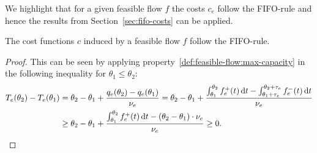 We highlight that for a given feasible flow $f$ the costs $c_e$ follow the FIFO-rule and hence the results from Section~\ref{sec:fifo-costs} can be applied.
\begin{proposition}
    The cost functions $c$ induced by a feasible flow $f$ follow the FIFO-rule.
\end{proposition}
\begin{proof}
    This can be seen by applying property~\ref{def:feasible-flow:max-capacity} in the following inequality for $\theta_1\leq \theta_2$:
    \begin{align*}
        T_e(\theta_2) - T_e(\theta_1)
        &= \theta_2 - \theta_1 + \frac{q_e(\theta_2) - q_e(\theta_1)}{\nu_e}
        = \theta_2 - \theta_1 + \frac{\int_{\theta_1}^{\theta_2}f_e^+(t)\,\textnormal{d} t - \int_{\theta_1 + \tau_e}^{\theta_2 + \tau_e} f_e^-(t) \,\textnormal{d} t}{\nu_e}\\
        &\geq \theta_2 - \theta_1 + \frac{\int_{\theta_1}^{\theta_2} {f}^+_e(t)\,\textnormal{d} t - (\theta_2 - \theta_1)\cdot \nu_e}{\nu_e} \geq 0.
    \end{align*}
\end{proof}
